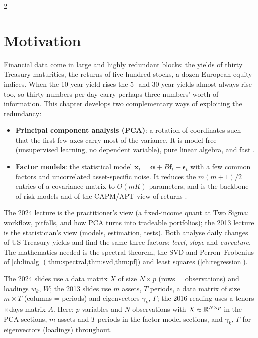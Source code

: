\begin{paracol}{2}
\section*{Motivation}
Financial data come in large and highly redundant blocks: the yields of thirty Treasury maturities,
the returns of five hundred stocks, a dozen European equity indices. When the 10-year yield rises the
5- and 30-year yields almost always rise too, so thirty numbers per day carry perhaps three numbers'
worth of information. This chapter develops two complementary ways of exploiting the redundancy:
\begin{itemize}
  \item \textbf{Principal component analysis (PCA)}: a rotation of coordinates such that the first few
        axes carry most of the variance. It is model-free (unsupervised learning, no dependent
        variable), pure linear algebra, and fast .
  \item \textbf{Factor models}: the statistical model $\bm x_t=\bm\alpha+B\bm f_t+\bm\epsilon_t$ with a few
        common factors and uncorrelated asset-specific noise. It reduces the $m(m+1)/2$ entries of a
        covariance matrix to $O(mK)$ parameters, and is the backbone of risk models and of the
        CAPM/APT view of returns .
\end{itemize}
The 2024 lecture is the practitioner's view (a fixed-income quant at Two Sigma: workflow, pitfalls, and
how PCA turns into tradeable portfolios); the 2013 lecture is the statistician's view (models, estimation,
tests). Both analyse daily changes of US Treasury yields and find the same three factors: \emph{level},
\emph{slope} and \emph{curvature}. The mathematics needed is the spectral theorem, the SVD and
Perron--Frobenius of \cref{ch:linalg} (\cref{thm:spectral,thm:svd,thm:pf}) and least squares
(\cref{ch:regression}).

\begin{coursenote}
The 2024 slides use a data matrix $X$ of size $N\times p$ (rows = observations) and loadings $w_k$, $W$;
the 2013 slides use $m$ assets, $T$ periods, a data matrix of size $m\times T$ (columns = periods) and
eigenvectors $\gamma_k$, $\Gamma$; the 2016 reading uses a tenors$\times$days matrix $A$. Here:
$p$ variables and $N$ observations with $X\in\mathbb{R}^{N\times p}$ in the PCA sections, $m$ assets and $T$ periods in
the factor-model sections, and $\gamma_k$, $\Gamma$ for eigenvectors (loadings) throughout.
\end{coursenote}


\end{paracol}
